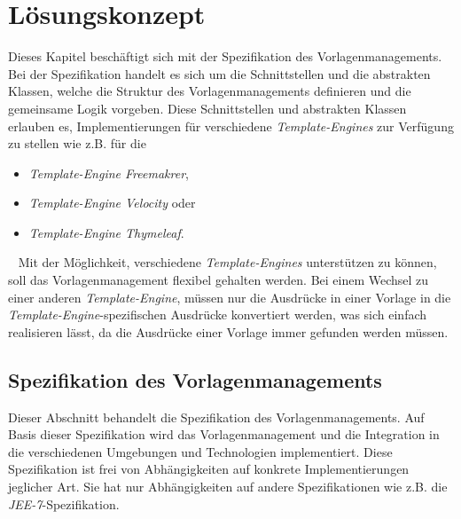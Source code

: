 \chapter{Lösungskonzept}
\label{cha:Lösungskonzept}
Dieses Kapitel beschäftigt sich mit der Spezifikation des Vorlagenmanagements. Bei der Spezifikation handelt es sich um die Schnittstellen und die abstrakten Klassen, welche die Struktur des Vorlagenmanagements definieren und die gemeinsame Logik vorgeben. Diese Schnittstellen und abstrakten Klassen erlauben es, Implementierungen für verschiedene \emph{Template-Engines} zur Verfügung zu stellen wie z.B. für die
\begin{itemize}
	\item \emph{Template-Engine Freemakrer},
	\item \emph{Template-Engine Velocity} oder
	\item \emph{Template-Engine Thymeleaf}.
\end{itemize}
\ \newline
Mit der Möglichkeit, verschiedene \emph{Template-Engines} unterstützen zu können, soll das Vorlagenmanagement flexibel gehalten werden. Bei einem Wechsel zu einer anderen \emph{Template-Engine}, müssen nur die Ausdrücke in einer Vorlage in die \emph{Template-Engine}-spezifischen Ausdrücke konvertiert werden, was sich einfach realisieren lässt, da die Ausdrücke einer Vorlage immer gefunden werden müssen.

\section{Spezifikation des Vorlagenmanagements}
\label{sec:specification-template-management}
Dieser Abschnitt behandelt die Spezifikation des Vorlagenmanagements. Auf Basis dieser Spezifikation wird das Vorlagenmanagement und die Integration in die verschiedenen Umgebungen und Technologien implementiert. Diese Spezifikation ist frei von Abhängigkeiten auf konkrete Implementierungen jeglicher Art. Sie hat nur Abhängigkeiten auf andere Spezifikationen wie z.B. die \emph{JEE-7}-Spezifikation.
\newpage

